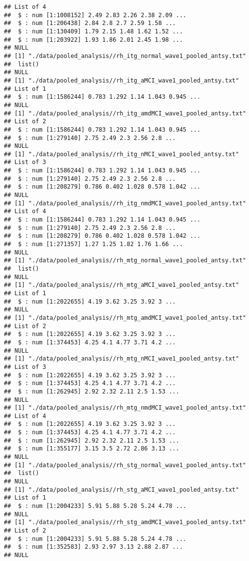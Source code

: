 \documentclass[12pt]{article}\usepackage[]{graphicx}\usepackage[]{color}
\makeatletter
\newenvironment{kframe}{%
 \def\at@end@of@kframe{}%
 \ifinner\ifhmode%
  \def\at@end@of@kframe{\end{minipage}}%
  \begin{minipage}{\columnwidth}%
 \fi\fi%
 \def\FrameCommand##1{\hskip\@totalleftmargin \hskip-\fboxsep
 \colorbox{shadecolor}{##1}\hskip-\fboxsep
     \hskip-\linewidth \hskip-\@totalleftmargin \hskip\columnwidth}%
 \MakeFramed {\advance\hsize-\width
   \@totalleftmargin\z@ \linewidth\hsize
   \@setminipage}}%
 {\par\unskip\endMakeFramed%
 \at@end@of@kframe}
\newenvironment{knitrout}{}{} %
\makeatother
\begin{document}
\begin{knitrout}
\begin{kframe}
\begin{verbatim}
## List of 4
##  $ : num [1:1008152] 2.49 2.83 2.26 2.38 2.09 ...
##  $ : num [1:206438] 2.84 2.8 2.7 2.59 1.58 ...
##  $ : num [1:130409] 1.79 2.15 1.48 1.62 1.52 ...
##  $ : num [1:203922] 1.93 1.86 2.01 2.45 1.98 ...
## NULL
## [1] "./data/pooled_analysis//rh_itg_normal_wave1_pooled_antsy.txt"
##  list()
## NULL
## [1] "./data/pooled_analysis//rh_itg_aMCI_wave1_pooled_antsy.txt"
## List of 1
##  $ : num [1:1586244] 0.783 1.292 1.14 1.043 0.945 ...
## NULL
## [1] "./data/pooled_analysis//rh_itg_amdMCI_wave1_pooled_antsy.txt"
## List of 2
##  $ : num [1:1586244] 0.783 1.292 1.14 1.043 0.945 ...
##  $ : num [1:279140] 2.75 2.49 2.3 2.56 2.8 ...
## NULL
## [1] "./data/pooled_analysis//rh_itg_nMCI_wave1_pooled_antsy.txt"
## List of 3
##  $ : num [1:1586244] 0.783 1.292 1.14 1.043 0.945 ...
##  $ : num [1:279140] 2.75 2.49 2.3 2.56 2.8 ...
##  $ : num [1:208279] 0.786 0.402 1.028 0.578 1.042 ...
## NULL
## [1] "./data/pooled_analysis//rh_itg_nmdMCI_wave1_pooled_antsy.txt"
## List of 4
##  $ : num [1:1586244] 0.783 1.292 1.14 1.043 0.945 ...
##  $ : num [1:279140] 2.75 2.49 2.3 2.56 2.8 ...
##  $ : num [1:208279] 0.786 0.402 1.028 0.578 1.042 ...
##  $ : num [1:271357] 1.27 1.25 1.82 1.76 1.66 ...
## NULL
## [1] "./data/pooled_analysis//rh_mtg_normal_wave1_pooled_antsy.txt"
##  list()
## NULL
## [1] "./data/pooled_analysis//rh_mtg_aMCI_wave1_pooled_antsy.txt"
## List of 1
##  $ : num [1:2022655] 4.19 3.62 3.25 3.92 3 ...
## NULL
## [1] "./data/pooled_analysis//rh_mtg_amdMCI_wave1_pooled_antsy.txt"
## List of 2
##  $ : num [1:2022655] 4.19 3.62 3.25 3.92 3 ...
##  $ : num [1:374453] 4.25 4.1 4.77 3.71 4.2 ...
## NULL
## [1] "./data/pooled_analysis//rh_mtg_nMCI_wave1_pooled_antsy.txt"
## List of 3
##  $ : num [1:2022655] 4.19 3.62 3.25 3.92 3 ...
##  $ : num [1:374453] 4.25 4.1 4.77 3.71 4.2 ...
##  $ : num [1:262945] 2.92 2.32 2.11 2.5 1.53 ...
## NULL
## [1] "./data/pooled_analysis//rh_mtg_nmdMCI_wave1_pooled_antsy.txt"
## List of 4
##  $ : num [1:2022655] 4.19 3.62 3.25 3.92 3 ...
##  $ : num [1:374453] 4.25 4.1 4.77 3.71 4.2 ...
##  $ : num [1:262945] 2.92 2.32 2.11 2.5 1.53 ...
##  $ : num [1:355177] 3.15 3.5 2.72 2.86 3.13 ...
## NULL
## [1] "./data/pooled_analysis//rh_stg_normal_wave1_pooled_antsy.txt"
##  list()
## NULL
## [1] "./data/pooled_analysis//rh_stg_aMCI_wave1_pooled_antsy.txt"
## List of 1
##  $ : num [1:2004233] 5.91 5.88 5.28 5.24 4.78 ...
## NULL
## [1] "./data/pooled_analysis//rh_stg_amdMCI_wave1_pooled_antsy.txt"
## List of 2
##  $ : num [1:2004233] 5.91 5.88 5.28 5.24 4.78 ...
##  $ : num [1:352583] 2.93 2.97 3.13 2.88 2.87 ...
## NULL

\end{verbatim}
\end{kframe}
\end{knitrout}
\end{document}
